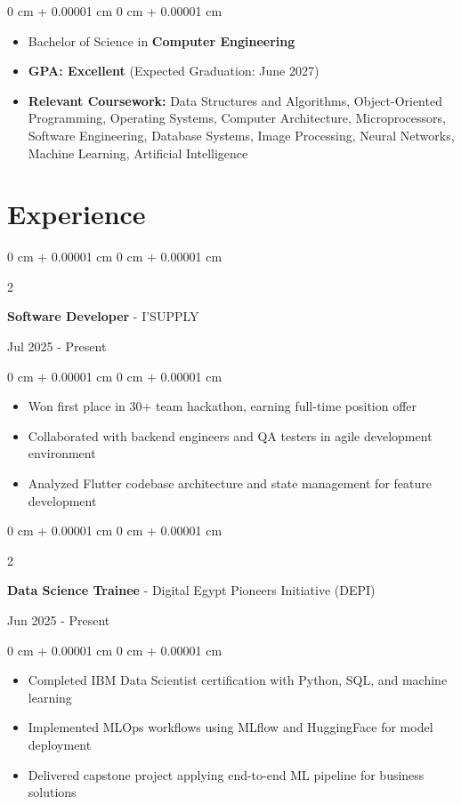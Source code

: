 \documentclass[10pt, letterpaper]{article}
\newenvironment{highlights}{
\begin{itemize}[
topsep=0.10 cm,
parsep=0.10 cm,
partopsep=0pt,
itemsep=0pt,
leftmargin=0 cm + 10pt
]
}{
\end{itemize}
} %
\newenvironment{onecolentry}{
\begin{adjustwidth}{
0 cm + 0.00001 cm
}{
0 cm + 0.00001 cm
}
}{
\end{adjustwidth}
} %
\newenvironment{twocolentry}[2][]{
\onecolentry
\def\secondColumn{#2}
\setcolumnwidth{\fill, 4.5 cm}
\begin{paracol}{2}
}{
\switchcolumn \raggedleft \secondColumn
\end{paracol}
\endonecolentry
} %
\begin{document}
\vspace{0.10cm}

\begin{onecolentry}
\begin{highlights}
\item Bachelor of Science in \textbf{Computer Engineering}
\item \textbf{GPA: Excellent} (Expected Graduation: June 2027)
\item \textbf{Relevant Coursework:} Data Structures and Algorithms, Object-Oriented Programming, Operating Systems, Computer Architecture, Microprocessors, Software Engineering, Database Systems, Image Processing, Neural Networks, Machine Learning, Artificial Intelligence
\end{highlights}
\end{onecolentry}




\section{Experience}
\vspace{0.2cm}
\begin{twocolentry}{
Jul 2025 - Present
}
\textbf{\large Software Developer} - I'SUPPLY
\end{twocolentry}
\vspace{0.1 cm}

\begin{onecolentry}
\begin{highlights}
\item Won first place in 30+ team hackathon, earning full-time position offer
\item Collaborated with backend engineers and QA testers in agile development environment
\item Analyzed Flutter codebase architecture and state management for feature development
\end{highlights}
\end{onecolentry}

\vspace{0.1cm}

\begin{twocolentry}{
Jun 2025 - Present
}
\textbf{\large Data Science Trainee} - Digital Egypt Pioneers Initiative (DEPI)
\end{twocolentry}

\vspace{0.1cm}

\begin{onecolentry}
\begin{highlights}
\item Completed IBM Data Scientist certification with Python, SQL, and machine learning
\item Implemented MLOps workflows using MLflow and HuggingFace for model deployment
\item Delivered capstone project applying end-to-end ML pipeline for business solutions
\end{highlights}
\end{onecolentry}
\end{document}
